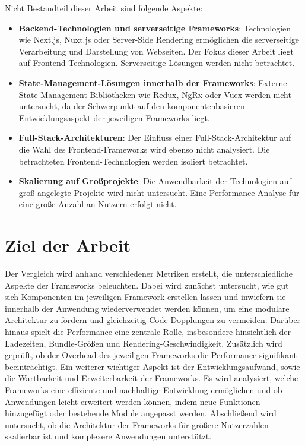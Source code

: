 \documentclass[oneside]{ausarbeitung}
\begin{document}
Nicht Bestandteil dieser Arbeit sind folgende Aspekte: 
\begin{itemize}
    \item \textbf{Backend-Technologien und serverseitige Frameworks}:  
          Technologien wie Next.js, Nuxt.js oder Server-Side Rendering ermöglichen die serverseitige Verarbeitung und Darstellung von Webseiten.  
          Der Fokus dieser Arbeit liegt auf Frontend-Technologien. Serverseitige Lösungen werden nicht betrachtet.
    \item \textbf{State-Management-Lösungen innerhalb der Frameworks}:            Externe State-Management-Bibliotheken wie Redux, NgRx oder Vuex werden nicht 			          untersucht, da der Schwerpunkt auf den komponentenbasieren Entwicklungsaspekt der jeweiligen Frameworks liegt.
    \item \textbf{Full-Stack-Architekturen}:  
          Der Einfluss einer Full-Stack-Architektur auf die Wahl des Frontend-Frameworks wird ebenso nicht analysiert. Die betrachteten Frontend-Technologien werden isoliert betrachtet.
    \item \textbf{Skalierung auf Großprojekte}:  
          Die Anwendbarkeit der Technologien auf groß angelegte Projekte wird nicht untersucht. Eine Performance-Analyse für eine große Anzahl an Nutzern erfolgt nicht.
\end{itemize}

\section{Ziel der Arbeit}
\label{sec:ziel}

Der Vergleich wird anhand verschiedener Metriken erstellt, die unterschiedliche Aspekte der Frameworks beleuchten. Dabei wird zunächst untersucht, wie gut sich Komponenten im jeweiligen Framework erstellen lassen und inwiefern sie innerhalb der Anwendung wiederverwendet werden können, um eine modulare Architektur zu fördern und gleichzeitig Code-Dopplungen zu vermeiden. Darüber hinaus spielt die Performance eine zentrale Rolle, insbesondere hinsichtlich der Ladezeiten, Bundle-Größen und Rendering-Geschwindigkeit. Zusätzlich wird geprüft, ob der Overhead des jeweiligen Frameworks die Performance signifikant beeinträchtigt. Ein weiterer wichtiger Aspekt ist der Entwicklungsaufwand, sowie die Wartbarkeit und Erweiterbarkeit der Frameworks. Es wird analysiert, welche Frameworks eine effiziente und nachhaltige Entwicklung ermöglichen und ob Anwendungen leicht erweitert werden können, indem neue Funktionen hinzugefügt oder bestehende Module angepasst werden. Abschließend wird untersucht, ob die Architektur der Frameworks für größere Nutzerzahlen skalierbar ist und komplexere Anwendungen unterstützt.
\end{document}
